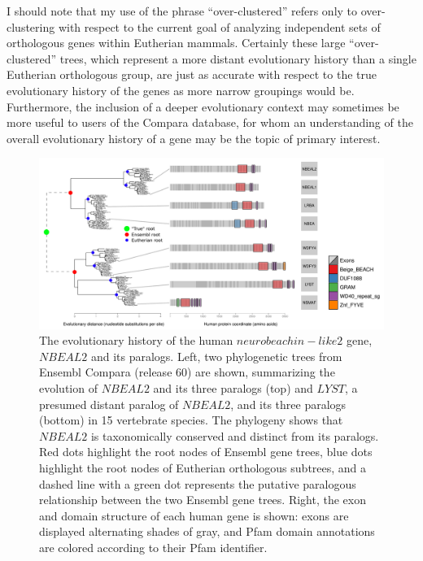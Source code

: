 I should note that my use of the phrase ``over-clustered'' refers only
to over-clustering with respect to the current goal of analyzing
independent sets of orthologous genes within Eutherian
mammals. Certainly these large ``over-clustered'' trees, which
represent a more distant evolutionary history than a single Eutherian
orthologous group, are just as accurate with respect to the true
evolutionary history of the genes as more narrow groupings would
be. Furthermore, the inclusion of a deeper evolutionary context may
sometimes be more useful to users of the Compara database, for whom an
understanding of the overall evolutionary history of a gene may be the
topic of primary interest.

\begin{figure}[h]
\centering
\includegraphics[scale=0.3]{Figs/nbeal2_full.pdf}
\caption{The evolutionary history of the human $neurobeachin-like 2$
  gene, $NBEAL2$ and its paralogs. Left, two phylogenetic trees from
  Ensembl Compara (release 60) are shown, summarizing the evolution of
  $NBEAL2$ and its three paralogs (top) and $LYST$, a presumed distant
  paralog of $NBEAL2$, and its three paralogs (bottom) in 15
  vertebrate species. The phylogeny shows that $NBEAL2$ is
  taxonomically conserved and distinct from its paralogs. Red dots
  highlight the root nodes of Ensembl gene trees, blue dots highlight
  the root nodes of Eutherian orthologous subtrees, and a dashed line
  with a green dot represents the putative paralogous relationship
  between the two Ensembl gene trees. Right, the exon and domain
  structure of each human gene is shown: exons are displayed
  alternating shades of gray, and Pfam domain annotations are colored
  according to their Pfam identifier.}
\label{nbeal2}
\end{figure}

